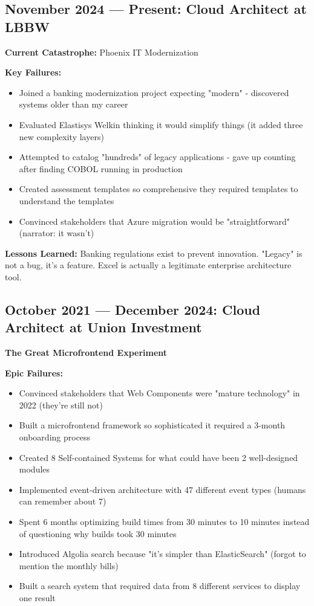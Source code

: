 \documentclass[10pt,a4paper]{article}
\begin{document}
\subsection{November 2024 — Present: Cloud Architect at LBBW}
\textbf{Current Catastrophe:} Phoenix IT Modernization

\textbf{Key Failures:}
\begin{itemize}[leftmargin=*,itemsep=1pt]
    \item Joined a banking modernization project expecting "modern" - discovered systems older than my career
    \item Evaluated Elastisys Welkin thinking it would simplify things (it added three new complexity layers)
    \item Attempted to catalog "hundreds" of legacy applications - gave up counting after finding COBOL running in production
    \item Created assessment templates so comprehensive they required templates to understand the templates
    \item Convinced stakeholders that Azure migration would be "straightforward" (narrator: it wasn't)
\end{itemize}

\textbf{Lessons Learned:} Banking regulations exist to prevent innovation. "Legacy" is not a bug, it's a feature. Excel is actually a legitimate enterprise architecture tool.

\subsection{October 2021 — December 2024: Cloud Architect at Union Investment}
\textbf{The Great Microfrontend Experiment}

\textbf{Epic Failures:}
\begin{itemize}[leftmargin=*,itemsep=1pt]
    \item Convinced stakeholders that Web Components were "mature technology" in 2022 (they're still not)
    \item Built a microfrontend framework so sophisticated it required a 3-month onboarding process
    \item Created 8 Self-contained Systems for what could have been 2 well-designed modules
    \item Implemented event-driven architecture with 47 different event types (humans can remember about 7)
    \item Spent 6 months optimizing build times from 30 minutes to 10 minutes instead of questioning why builds took 30 minutes
    \item Introduced Algolia search because "it's simpler than ElasticSearch" (forgot to mention the monthly bills)
    \item Built a search system that required data from 8 different services to display one result
\end{itemize}
\end{document}
